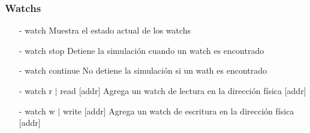 \documentclass[aspectratio=169]{beamer}
\begin{document}
\begin{frame}
\frametitle{Watchs}
    \begin{itemize}
    \item[-] watch \hspace{0.5cm}
    \textcolor{verdeuca}{Muestra el estado actual de los watchs} %
    \vspace{0.2cm}
    \item[-] watch stop \hspace{0.5cm}
    \textcolor{verdeuca}{Detiene la simulación cuando un watch es encontrado} %
    \vspace{0.2cm}
    \item[-] watch continue \hspace{0.5cm}
    \textcolor{verdeuca}{No detiene la simulación si un wath es encontrado} %
    \vspace{0.2cm}
    \item[-] watch r $|$ read [addr] \hspace{0.5cm}
    \textcolor{verdeuca}{Agrega un watch de lectura en la dirección física [addr]} %
    \vspace{0.2cm}
    \item[-] watch w $|$ write [addr] \hspace{0.5cm}
    \textcolor{verdeuca}{Agrega un watch de escritura en la dirección física [addr]} %
    \end{itemize}
\end{frame}
\end{document}

